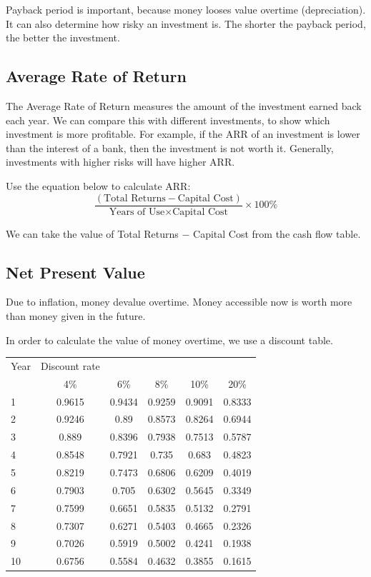 \documentclass{standalone}
\begin{document}
Payback period is important, because money looses value overtime (depreciation).
It can also determine how risky an investment is.
The shorter the payback period, the better the investment.

\subsection{Average Rate of Return}
The Average Rate of Return measures the amount of the investment earned back each year.
We can compare this with different investments, to show which investment is more profitable.
For example, if the ARR of an investment is lower than the interest of a bank, then the investment is not worth it.
Generally, investments with higher risks will have higher ARR.

Use the equation below to calculate ARR:
\begin{equation}
    \frac{(\textrm{Total Returns} - \textrm{Capital Cost})}{\textrm{Years of Use} \times \textrm{Capital Cost}} \times 100 \%
\end{equation}

We can take the value of Total Returns $-$ Capital Cost from the cash flow table.

\subsection{Net Present Value}
Due to inflation, money devalue overtime.
Money accessible now is worth more than money given in the future.

In order to calculate the value of money overtime, we use a discount table.

\begin{tabular}{l c c c c c}
    Year   & Discount rate &        &        &        & \\
           & 4\%           & 6\%    & 8\%    & 10\%   & 20\% \\
    1      & 0.9615        & 0.9434 & 0.9259 & 0.9091 & 0.8333 \\
    2      & 0.9246        & 0.89   & 0.8573 & 0.8264 & 0.6944 \\
    3      & 0.889         & 0.8396 & 0.7938 & 0.7513 & 0.5787 \\
    4      & 0.8548        & 0.7921 & 0.735  & 0.683  & 0.4823 \\
    5      & 0.8219        & 0.7473 & 0.6806 & 0.6209 & 0.4019 \\
    6      & 0.7903        & 0.705  & 0.6302 & 0.5645 & 0.3349 \\
    7      & 0.7599        & 0.6651 & 0.5835 & 0.5132 & 0.2791 \\
    8      & 0.7307        & 0.6271 & 0.5403 & 0.4665 & 0.2326 \\
    9      & 0.7026        & 0.5919 & 0.5002 & 0.4241 & 0.1938 \\
    10     & 0.6756        & 0.5584 & 0.4632 & 0.3855 & 0.1615
\end{tabular}
\end{document}
